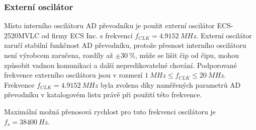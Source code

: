 \subsubsection{Externí oscilátor}
Místo interního oscilátoru AD převodníku je použit externí oscilátor ECS-2520MVLC od firmy ECS Inc. s frekvencí $f_{CLK} = 4.9152 \ MHz$. Externí oscilátor zaručí stabilní funkčnost AD převodníku, protože přesnost interního oscilátoru není výrobcem zaručena, rozdíly až $\pm 30  \ \%$, může se lišit čip od čipu, mohou způsobit vadnou komunikaci a další nepredikovatelné chování.
Podporované frekvence externího oscilátoru jsou v rozmezí $ 1 \ MHz \leq  f_{CLK} \leq 20 \ MHz $. Frekvence $f_{CLK} = 4.9152 \ MHz$ byla zvolena díky naměřených parametrů AD převodníku v katalogovém listu právě při použití této frekvence.
\par
Maximální možná přenosová rychlost pro tuto frekvenci oscilátoru je $f_s = 38400 \ Hz$.

